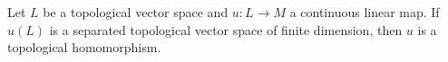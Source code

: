 Let $L$ be a topological vector space and $u: L \to M$ a continuous linear map. If $u(L)$ is a separated topological vector space of finite dimension, then $u$ is a topological homomorphism.
